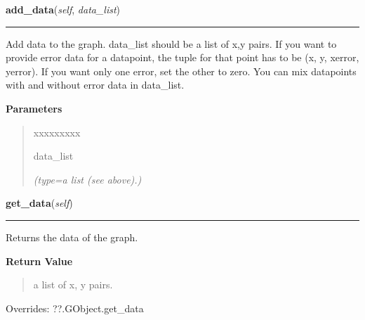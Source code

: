     \label{pygtk_chart:line_chart:Graph:add_data}

    \vspace{0.5ex}

\hspace{.8\funcindent}\begin{boxedminipage}{\funcwidth}

    \raggedright \textbf{add\_data}(\textit{self}, \textit{data\_list})

    \vspace{-1.5ex}

    \rule{\textwidth}{0.5\fboxrule}
\setlength{\parskip}{2ex}
    Add data to the graph. data\_list should be a list of x,y pairs. If you
    want to provide error data for a datapoint, the tuple for that point 
    has to be (x, y, xerror, yerror). If you want only one error, set the 
    other to zero. You can mix datapoints with and without error data in 
    data\_list.

\setlength{\parskip}{1ex}
      \textbf{Parameters}
      \vspace{-1ex}

      \begin{quote}
        \begin{Ventry}{xxxxxxxxx}

          \item[data\_list]

            {\it (type=a list (see above).)}

        \end{Ventry}

      \end{quote}

    \end{boxedminipage}

    \vspace{0.5ex}

\hspace{.8\funcindent}\begin{boxedminipage}{\funcwidth}

    \raggedright \textbf{get\_data}(\textit{self})

    \vspace{-1.5ex}

    \rule{\textwidth}{0.5\fboxrule}
\setlength{\parskip}{2ex}
    Returns the data of the graph.

\setlength{\parskip}{1ex}
      \textbf{Return Value}
    \vspace{-1ex}

      \begin{quote}
      a list of x, y pairs.

      \end{quote}

      Overrides: ??.GObject.get\_data

    \end{boxedminipage}

